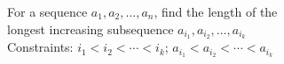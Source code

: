 \documentclass[preview]{standalone}
\begin{document}
\centering For a sequence $a_1, a_2, \ldots , a_n$, find the length of the\\ longest increasing subsequence $a_{i_1}, a_{i_2}, \ldots , a_{i_k}$\\ Constraints: $i_1 < i_2 < \cdots < i_k$; $a_{i_1} < a_{i_2} < \cdots < a_{i_k}$
\end{document}
